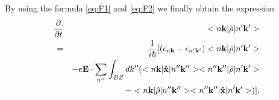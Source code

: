 \documentclass[aps,prb,preprint]{revtex4-1}
\begin{document}
By using the formula \ref{eq:F1} and \ref{eq:F2} we finally obtain the expression
\begin{eqnarray}\label{eq:BL} 
\frac{ \partial }{\partial t } &&<n{\bf k}| \hat{\rho} |n'{\bf k'}> \nonumber \\
= &&\frac{1}{i \hbar} [ (\epsilon_{n{\bf k}}-\epsilon_{n'{\bf k'}}) <n{\bf k}| \hat{\rho} |n'{\bf k'}> \nonumber  \\
&&-e{\bf E} \cdot \sum_{n''}\int_{BZ} dk'' ( <n{\bf k}| {\bf \hat{x}} |n''{\bf k''}> <n''{\bf k''}| \hat{\rho} |n'{\bf k'}> \nonumber  \\
&&- <n{\bf k}| \hat{\rho} |n''{\bf k''}> <n''{\bf k''}| {\bf \hat{x}} |n'{\bf k'}> ) ].
\end{eqnarray}

\end{document}
